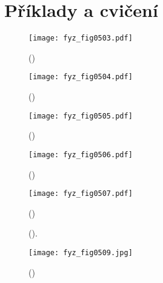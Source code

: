   \section{Příklady a cvičení}\label{fyz:IchappXXXIVsecX}

  \begin{figure}[ht!] %
    \centering
    \texttt{[image: fyz\_fig0503.pdf]}
    \caption{
             (\cite[s.~697]{Feynman01})}
    \label{fyz:fig0503}
  \end{figure}

  \begin{figure}[ht!] %
    \centering
    \texttt{[image: fyz\_fig0504.pdf]}
    \caption{
             (\cite[s.~697]{Feynman01})}
    \label{fyz:fig0504}
  \end{figure}

  \begin{figure}[ht!] %
    \centering
    \texttt{[image: fyz\_fig0505.pdf]}
    \caption{
             (\cite[s.~697]{Feynman01})}
    \label{fyz:fig0505}
  \end{figure}
  
  \begin{figure}[ht!] %
    \centering
    \texttt{[image: fyz\_fig0506.pdf]}
    \caption{
             (\cite[s.~697]{Feynman01})}
    \label{fyz:fig0506}
  \end{figure}

  \begin{figure}[ht!] %
    \centering
    \texttt{[image: fyz\_fig0507.pdf]}
    \caption{
             (\cite[s.~697]{Feynman01})}
    \label{fyz:fig0507}
  \end{figure}

  \begin{figure}[hb!] %
    \centering
    \caption{
             (\cite[s.~601]{Feynman01}).}
    \label{fyz:fig0508}
  \end{figure}

  \begin{figure}[ht!] %
    \centering
    \texttt{[image: fyz\_fig0509.jpg]}
    \caption{
             (\cite[s.~697]{Feynman01})}
    \label{fyz:fig0509}
  \end{figure}

